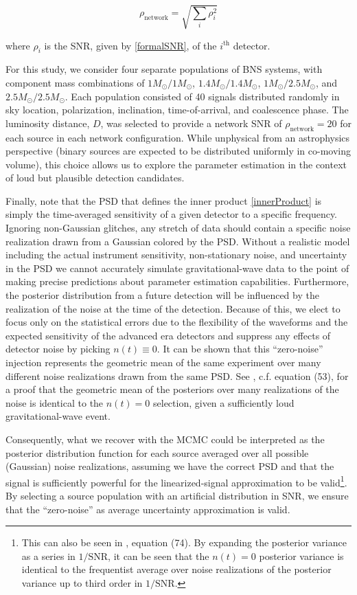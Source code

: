 \documentclass[11pt,a4paper]{emulateapj} 
\begin{document}
\begin{equation}
\rho_{\text{network}} = \sqrt{\sum_i \rho_{i}^2}
\label{SNRnetwork}
\end{equation}

\noindent where $\rho_i$ is the SNR, given by \eqref{formalSNR}, of
the $i^{\text{th}}$ detector.

For this study, we consider four separate populations of BNS systems,
with component mass combinations of $1M_{\odot}/1M_{\odot}$,
$1.4M_{\odot}/1.4M_{\odot}$, $1M_{\odot}/2.5M_{\odot}$, and
$2.5M_{\odot}/2.5M_{\odot}$.  Each population consisted of 40 signals
distributed randomly in sky location, polarization, inclination,
time-of-arrival, and coalescence phase.  The luminosity distance, $D$,
was selected to provide a network SNR of $\rho_{\text{network}}=20$
for each source in each network configuration. 
 While unphysical from an astrophysics perspective
(binary sources are expected to be distributed uniformly in co-moving volume), this
choice allows us to explore the parameter estimation in the context of
loud but plausible detection candidates.

Finally, note that the PSD that defines the inner
product \eqref{innerProduct} is simply the time-averaged sensitivity
of a given detector to a specific frequency.  Ignoring non-Gaussian
glitches, any stretch of data should contain a specific noise
realization drawn from a Gaussian colored by the PSD.  Without a
realistic model including the actual instrument sensitivity, non-stationary
 noise, and uncertainty in the PSD we cannot accurately
simulate gravitational-wave data to the point of making precise predictions about
parameter estimation capabilities.  Furthermore, the posterior
distribution from a future detection will be influenced by the
realization of the noise at the time of the detection.  Because of
this, we elect to focus only on the statistical errors due to the
flexibility of the waveforms and the expected sensitivity of the
advanced era detectors and suppress any effects of detector noise by
picking $n(t) \equiv 0$.  It can be shown that this ``zero-noise'' injection
represents the geometric mean of the same experiment over many different
noise realizations drawn from the same PSD.  See \cite{Nissanke2010}, c.f. equation
(53), for a proof that the geometric mean of the posteriors over many realizations of the 
noise is identical to the $n(t) = 0$ selection, given a sufficiently loud gravitational-wave
event.

Consequently, what we recover with the MCMC could be interpreted as
the posterior distribution function for each source averaged over all
possible (Gaussian) noise realizations, assuming we have the correct
PSD and that the signal is sufficiently powerful for the linearized-signal
approximation to be valid\footnote{This can also be seen in \cite{Vallisneri}, equation (74).
  By expanding the posterior variance as a series in $1/\text{SNR}$, it can be seen that the 
  $n(t) = 0$ posterior variance is identical to the frequentist average 
  over noise realizations of the posterior variance up to third order in $1/\text{SNR}$. }.
    By selecting a source population with an artificial distribution in SNR, we ensure that the
     ``zero-noise'' as average uncertainty approximation is valid.
\end{document}
